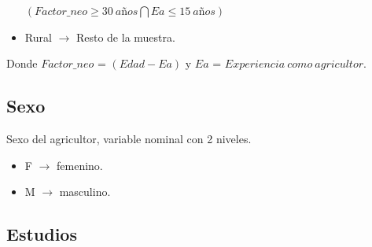 \documentclass[a4paper, nobind]{templates/ociamthesis}
\providecommand{\tightlist}{%
  \setlength{\itemsep}{0pt}\setlength{\parskip}{0pt}}
\begin{document}
\begin{itemize}
  \hspace*{0.333em}\hspace*{0.333em}\hspace*{0.333em}\hspace*{0.333em}\hspace*{0.333em}\hspace*{0.333em}\hspace*{0.333em}\hspace*{0.333em}\hspace*{0.333em}\hspace*{0.333em}\hspace*{0.333em}\hspace*{0.333em}\hspace*{0.333em}\hspace*{0.333em}\hspace*{0.333em}\hspace*{0.333em}\hspace*{0.333em}\hspace*{0.333em}\hspace*{0.333em}\hspace*{0.333em}\hspace*{0.333em}\hspace*{0.333em}\hspace*{0.333em}\((Factor\_neo \geq 30\ años \bigcap Ea \leq 15\ años)\)
\item
  Rural \(\rightarrow\) Resto de la muestra.
\end{itemize}

Donde \(Factor\_neo\) = \((Edad - Ea)\) y \(Ea\) = \(Experiencia\ como\ agricultor\).

\hypertarget{sexo}{%
\subsection{Sexo}\label{sexo}}

Sexo del agricultor, variable nominal con 2 niveles.

\begin{itemize}
\tightlist
\item
  F \(\rightarrow\) femenino.
\item
  M \(\rightarrow\) masculino.
\end{itemize}

\hypertarget{estudios}{%
\subsection{Estudios}\label{estudios}}
\end{document}
